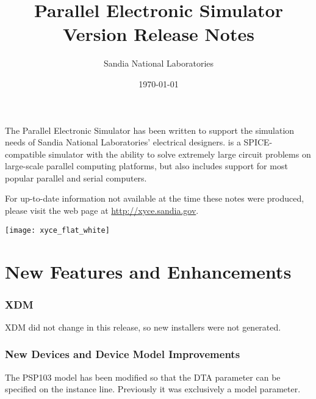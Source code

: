 \documentclass[letterpaper]{scrartcl}
\title{\XyceTitle{} Parallel Electronic Simulator\\
Version \XyceVersionVar{} Release Notes}
\author{ Sandia National Laboratories}
\date{\today}
\begin{document}
\maketitle


The \XyceTM{} Parallel Electronic Simulator has been written to support the
simulation needs of Sandia National Laboratories' electrical designers.
\XyceTM{} is a SPICE-compatible simulator with the ability to solve extremely
large circuit problems on large-scale parallel computing platforms, but also
includes support for most popular parallel and serial computers.

For up-to-date information not available at the time these notes were produced,
please visit the \XyceTM{} web page at
{\color{XyceDeepRed}\url{http://xyce.sandia.gov}}.

\tableofcontents
\vspace*{\fill}
\parbox{\textwidth}
{
  \hfill
  \texttt{[image: xyce\_flat\_white]}
}


\newpage
\section{New Features and Enhancements}

\subsubsection*{XDM}
\begin{XyceItemize}
\item XDM did not change in this release, so new installers were not generated.
\end{XyceItemize}

\subsubsection*{New Devices and Device Model Improvements}
\begin{XyceItemize}
\item The PSP103 model has been modified so that the DTA parameter can be
     specified on the instance line.  Previously it was exclusively a model
     parameter.
\end{XyceItemize}
\end{document}
